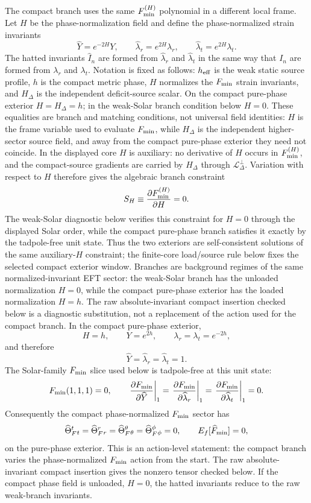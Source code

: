 \documentclass[12pt,a4paper]{article}
\begin{document}
The compact branch uses the same $F_{\rm min}^{(H)}$ polynomial in a different
local frame.  Let $H$ be the phase-normalization field and define the
phase-normalized
strain invariants
\[
\widehat Y=e^{-2H}Y,\qquad
\widehat\lambda_r=e^{2H}\lambda_r,\qquad
\widehat\lambda_t=e^{2H}\lambda_t.
\]
The hatted invariants $\widehat I_n$ are formed from
$\widehat\lambda_r$ and $\widehat\lambda_t$ in the same way that $I_n$ are
formed from $\lambda_r$ and $\lambda_t$.
Notation is fixed as follows: $h_{\rm eff}$ is the weak static source profile,
$h$ is the compact metric phase, $H$ normalizes the $F_{\rm min}$ strain
invariants, and $H_\Delta$ is the independent deficit-source scalar. On the
compact pure-phase exterior $H=H_\Delta=h$; in the weak-Solar branch condition below
$H=0$.
These equalities are branch and matching conditions, not universal field
identities: $H$ is the frame variable used to evaluate $F_{\rm min}$, while
$H_\Delta$ is the independent higher-sector source field, and away from the
compact pure-phase exterior they need not coincide.
In the displayed core $H$ is auxiliary: no derivative of $H$ occurs in
$F_{\rm min}^{(H)}$, and the compact-source gradients are carried by
$H_\Delta$ through $\mathcal L_\Delta^\perp$. Variation with respect to $H$
therefore gives the algebraic branch constraint
\[
S_H\equiv\frac{\partial F_{\rm min}^{(H)}}{\partial H}=0.
\]
The weak-Solar diagnostic below verifies this constraint for $H=0$ through the
displayed Solar order, while the compact pure-phase branch satisfies it exactly
by the tadpole-free unit state. Thus the two exteriors are self-consistent
solutions of the same auxiliary-$H$ constraint; the finite-core load/source
rule below fixes the selected compact exterior window.
Branches are background regimes of the same normalized-invariant EFT sector:
the weak-Solar branch has the unloaded normalization $H=0$, while the compact
pure-phase exterior has the loaded normalization $H=h$. The raw
absolute-invariant compact insertion checked below is a diagnostic substitution, not a
replacement of the action used for the compact branch.
In the compact pure-phase exterior,
\[
H=h,\qquad Y=e^{2h},\qquad
\lambda_r=\lambda_t=e^{-2h},
\]
and therefore
\[
\widehat Y=\widehat\lambda_r=\widehat\lambda_t=1.
\]
The Solar-family $F_{\rm min}$ slice used below is tadpole-free at this unit
state:
\[
F_{\rm min}(1,1,1)=0,\qquad
\left.\frac{\partial F_{\rm min}}{\partial\widehat Y}\right|_1=
\left.\frac{\partial F_{\rm min}}{\partial\widehat\lambda_r}\right|_1=
\left.\frac{\partial F_{\rm min}}{\partial\widehat\lambda_t}\right|_1=0.
\]
Consequently the compact phase-normalized $F_{\rm min}$ sector has
\[
\widehat\Theta_F^t{}_t=
\widehat\Theta_F^r{}_r=
\widehat\Theta_F^\theta{}_\theta=
\widehat\Theta_F^\phi{}_\phi=0,\qquad
E_f[\widehat F_{\rm min}]=0,
\]
on the pure-phase exterior. This is an action-level statement: the compact
branch varies the phase-normalized $F_{\rm min}$ action from the start. The raw
absolute-invariant compact insertion gives the nonzero tensor checked below. If
the compact phase field is unloaded, $H=0$, the hatted invariants reduce to the
raw weak-branch invariants.
\end{document}
